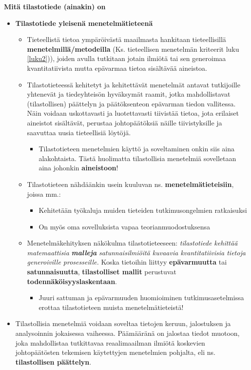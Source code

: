 \documentclass[
]{book}
\providecommand{\tightlist}{%
  \setlength{\itemsep}{0pt}\setlength{\parskip}{0pt}}
\begin{document}
\hfill\break
\hfill\break

\textbf{Mitä tilastotiede (ainakin) on}

\begin{itemize}
\tightlist
\item
  \textbf{Tilastotiede yleisenä menetelmätieteenä}

  \begin{itemize}
  \tightlist
  \item
    Tieteellistä tietoa ympäröivästä maailmasta hankitaan tieteellisillä \textbf{menetelmillä/metodeilla} (Ks. tieteellisen menetelmän kriteerit luku \ref{luku2})), joiden avulla tutkitaan jotain ilmiötä tai sen generoimaa kvantitatiivista mutta epävarmaa tietoa sisältävää aineistoa.
  \item
    Tilastotieteessä kehitetyt ja kehitettävät menetelmät antavat tutkijoille yhtenevät ja tiedeyhteisön hyväksymät raamit, jotka mahdollistavat (tilastollisen) päättelyn ja päätöksenteon epävarman tiedon vallitessa. Näin voidaan uskottavasti ja luotettavasti tiivistää tietoa, jota erilaiset aineistot sisältävät, perustaa johtopäätöksiä näille tiivistyksille ja saavuttaa uusia tieteellisiä löytöjä.

    \begin{itemize}
    \tightlist
    \item
      Tilastotieteen menetelmien käyttö ja soveltaminen onkin siis aina alakohtaista. Tästä huolimatta tilastollisia menetelmiä sovelletaan aina johonkin \textbf{aineistoon}!
    \end{itemize}
  \item
    Tilastotieteen nähdäänkin usein kuuluvan ns. \textbf{menetelmätieteisiin}, joissa mm.:

    \begin{itemize}
    \tightlist
    \item
      Kehitetään työkaluja muiden tieteiden tutkimusongelmien ratkaisuksi
    \item
      On myös oma sovelluksista vapaa teorianmuodostuksensa
    \end{itemize}
  \item
    Menetelmäkehityksen näkökulma tilastotieteeseen: \emph{tilastotiede kehittää matemaattisia} \textbf{\emph{malleja}} \emph{satunnaisilmiöitä kuvaavia kvantitatiivisia tietoja generoiville prosesseille.} Koska tietoihin liittyy \textbf{epävarmuutta} tai \textbf{satunnaisuutta}, \textbf{tilastolliset mallit} perustuvat \textbf{todennäköisyyslaskentaan}.

    \begin{itemize}
    \tightlist
    \item
      Juuri sattuman ja epävarmuuden huomioiminen tutkimusasetelmissa erottaa tilastotieteen muista menetelmätieteistä!
    \end{itemize}
  \end{itemize}
\item
  Tilastollisia menetelmiä voidaan soveltaa tietojen keruun, jalostuksen ja analysoinnin jokaisessa vaiheessa. Päämääränä on jalostaa tiedot muotoon, joka mahdollistaa tutkittavaa reaalimaailman ilmiötä koskevien johtopäätösten tekemisen käytettyjen menetelmien pohjalta, eli ns. \textbf{tilastollisen päättelyn}.


\end{itemize}
\end{document}
